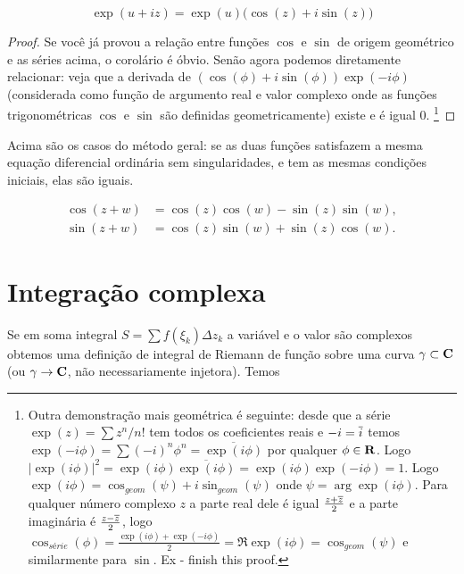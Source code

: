 \begin{cor}
\begin{equation}
\exp(u+iz) = \exp(u) \big( \cos(z) + i \sin(z) \big)
\end{equation}
\end{cor}
\begin{proof}
Se você já provou a relação entre funções $\cos$ e $\sin$ de origem geométrico e as séries acima,
o corolário é óbvio. Senão agora podemos diretamente relacionar: veja que a derivada de
$(\cos(\phi) + i \sin(\phi)) \exp(-i\phi)$ (considerada como função de argumento real e valor complexo
onde as funções trigonométricas $\cos$ e $\sin$ são definidas geometricamente)
existe e é igual $0$.
\footnote{
Outra demonstração mais geométrica é seguinte:
desde que a série $\exp(z) = \sum z^n / n!$ tem todos os coeficientes reais e $-i = \overline{i}$ temos
$\exp(-i\phi) = \sum (-i)^n \phi^n = \overline{\exp(i\phi)}$ por qualquer $\phi \in \mathbf{R}$.
Logo $|\exp(i\phi)|^2 = \exp(i\phi) \overline{\exp(i\phi)} = \exp(i\phi) \exp(-i\phi) = 1$.
Logo $\exp(i\phi) = \cos_{geom}(\psi) + i \sin_{geom}(\psi)$ onde $\psi = \arg \exp(i\phi)$.
Para qualquer número complexo $z$ a parte real dele é igual $\frac{z+\overline{z}}2$
e a parte imaginária é $\frac{z-\overline{z}}2$, logo $\cos_{série}(\phi) = \frac{\exp(i\phi)+\exp(-i\phi)}2 = \Re \exp(i\phi) = \cos_{geom}(\psi)$ e similarmente para $\sin$.
Ex - finish this proof.
}
\end{proof}

\begin{remark}
Acima são os casos do método geral:
se as duas funções satisfazem a mesma equação diferencial ordinária sem singularidades,
e tem as mesmas condições iniciais, elas são iguais.
\end{remark}

\begin{cor}
\begin{align*}
\cos(z+w) &= \cos(z)\cos(w) - \sin(z)\sin(w), \\
\sin(z+w) &= \cos(z)\sin(w) + \sin(z)\cos(w). 
\end{align*}
\end{cor}

\section{Integração complexa}

Se em soma integral $S = \sum f(\xi_k) \Delta z_k$ a variável e o valor são complexos
obtemos uma definição de integral de Riemann de função sobre uma curva $\gamma \subset \mathbf{C}$
(ou $\gamma \to \mathbf{C}$, não necessariamente injetora). Temos

